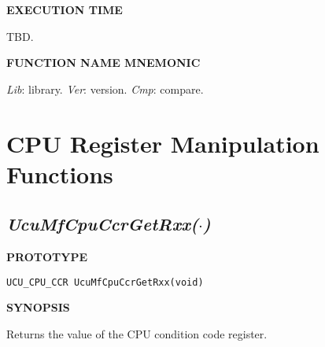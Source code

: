 \noindent\textbf{EXECUTION TIME}
\begin{list}{}{\setlength{\leftmargin}{0.25in}\setlength{\topsep}{0.0in}}
\item TBD.
\end{list}
\vspace{2.8ex}

\noindent\textbf{FUNCTION NAME MNEMONIC}
\begin{list}{}{\setlength{\leftmargin}{0.25in}\setlength{\topsep}{0.0in}}
\item \emph{Lib}: library.  \emph{Ver}: version.  \emph{Cmp}: compare.
\end{list}


\section{CPU Register Manipulation Functions}
\label{cmsc0:scpu0}


\subsection[\emph{UcuMfCpuCcrGetRxx(\protect\mbox{\protect$\cdot$})}]
           {\emph{UcuMfCpuCcrGetRxx(\protect\mbox{\protect\boldmath $\cdot$})}}
\label{cmsc0:scpu0:sccg0}

%

\noindent\textbf{PROTOTYPE}
\begin {list}{}{\setlength{\leftmargin}{0.25in}\setlength{\topsep}{0.0in}}
\item
\begin{verbatim}
UCU_CPU_CCR UcuMfCpuCcrGetRxx(void)
\end{verbatim}
\end{list}
\vspace{2.8ex}

\noindent\textbf{SYNOPSIS}
\begin{list}{}{\setlength{\leftmargin}{0.25in}\setlength{\topsep}{0.0in}}
\item
Returns the value of the CPU condition code register.
\end{list}
\vspace{2.8ex}

